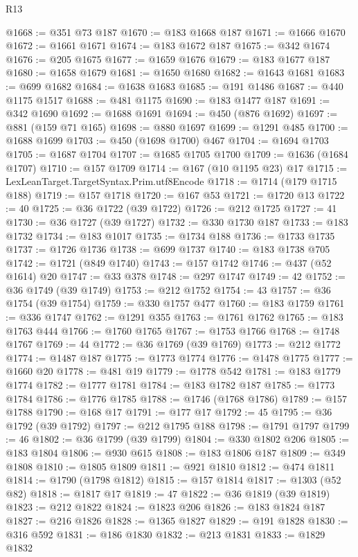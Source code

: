 \begin{lexlean}{R13}
\begin{coremodule}
@1668 := @351 @73 @187
@1670 := @183 @1668 @187
@1671 := @1666 @1670
@1672 := @1661 @1671
@1674 := @183 @1672 @187
@1675 := @342 @1674
@1676 := @205 @1675
@1677 := @1659 @1676
@1679 := @183 @1677 @187
@1680 := @1658 @1679
@1681 := @1650 @1680
@1682 := @1643 @1681
@1683 := @699 @1682
@1684 := @1638 @1683
@1685 := @191 @1486
@1687 := @440 @1175 @1517
@1688 := @481 @1175
@1690 := @183 @1477 @187
@1691 := @342 @1690
@1692 := @1688 @1691
@1694 := @450 (@876 @1692)
@1697 := @881 (@159 @71 @165)
@1698 := @880 @1697
@1699 := @1291 @485
@1700 := @1688 @1699
@1703 := @450 (@1698 @1700) @467
@1704 := @1694 @1703
@1705 := @1687 @1704
@1707 := @1685 @1705 @1700
@1709 := @1636 (@1684 @1707)
@1710 := @157 @1709
@1714 := @167 (@10 @1195 @23) @17
@1715 := LexLeanTarget.TargetSyntax.Prim.utf8Encode
@1718 := @1714 (@179 @1715 @188)
@1719 := @157 @1718
@1720 := @167 @53
@1721 := @1720 @13
@1722 := 40
@1725 := @36 @1722 (@39 @1722)
@1726 := @212 @1725
@1727 := 41
@1730 := @36 @1727 (@39 @1727)
@1732 := @330 @1730 @187
@1733 := @183 @1732
@1734 := @183 @1017
@1735 := @1734 @188
@1736 := @1733 @1735
@1737 := @1726 @1736
@1738 := @699 @1737
@1740 := @183 @1738 @705
@1742 := @1721 (@849 @1740)
@1743 := @157 @1742
@1746 := @437 (@52 @1614) @20
@1747 := @33 @378
@1748 := @297 @1747
@1749 := 42
@1752 := @36 @1749 (@39 @1749)
@1753 := @212 @1752
@1754 := 43
@1757 := @36 @1754 (@39 @1754)
@1759 := @330 @1757 @477
@1760 := @183 @1759
@1761 := @336 @1747
@1762 := @1291 @355
@1763 := @1761 @1762
@1765 := @183 @1763 @444
@1766 := @1760 @1765
@1767 := @1753 @1766
@1768 := @1748 @1767
@1769 := 44
@1772 := @36 @1769 (@39 @1769)
@1773 := @212 @1772
@1774 := @1487 @187
@1775 := @1773 @1774
@1776 := @1478 @1775
@1777 := @1660 @20
@1778 := @481 @19
@1779 := @1778 @542
@1781 := @183 @1779 @1774
@1782 := @1777 @1781
@1784 := @183 @1782 @187
@1785 := @1773 @1784
@1786 := @1776 @1785
@1788 := @1746 (@1768 @1786)
@1789 := @157 @1788
@1790 := @168 @17
@1791 := @177 @17
@1792 := 45
@1795 := @36 @1792 (@39 @1792)
@1797 := @212 @1795 @188
@1798 := @1791 @1797
@1799 := 46
@1802 := @36 @1799 (@39 @1799)
@1804 := @330 @1802 @206
@1805 := @183 @1804
@1806 := @930 @615
@1808 := @183 @1806 @187
@1809 := @349 @1808
@1810 := @1805 @1809
@1811 := @921 @1810
@1812 := @474 @1811
@1814 := @1790 (@1798 @1812)
@1815 := @157 @1814
@1817 := @1303 (@52 @82)
@1818 := @1817 @17
@1819 := 47
@1822 := @36 @1819 (@39 @1819)
@1823 := @212 @1822
@1824 := @1823 @206
@1826 := @183 @1824 @187
@1827 := @216 @1826
@1828 := @1365 @1827
@1829 := @191 @1828
@1830 := @316 @592
@1831 := @186 @1830
@1832 := @213 @1831
@1833 := @1829 @1832

\end{coremodule}
\end{lexlean}
